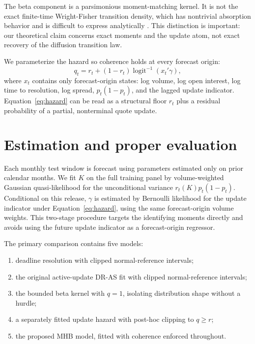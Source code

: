 \documentclass[11pt]{article}
\newcommand{\1}{\mathbb I}
\begin{document}
The beta component is a parsimonious moment-matching kernel. It is not the exact
finite-time Wright-Fisher transition density, which has nontrivial absorption
behavior and is difficult to express analytically \citep{roa2022smalltime}.
This distinction is important: our theoretical claim concerns exact moments and
the update atom, not exact recovery of the diffusion transition law.

We parameterize the hazard so coherence holds at every forecast origin:
\begin{equation}
q_t=r_t+(1-r_t)\operatorname{logit}^{-1}(x_t'\gamma),
\label{eq:hazard}
\end{equation}
where $x_t$ contains only forecast-origin states: log volume, log open interest,
log time to resolution, log spread, $p_t(1-p_t)$, and the lagged update
indicator. Equation~\eqref{eq:hazard} can be read as a structural floor $r_t$
plus a residual probability of a partial, nonterminal quote update.

\section{Estimation and proper evaluation}

Each monthly test window is forecast using parameters estimated only on prior
calendar months. We fit $K$ on the full training panel by volume-weighted Gaussian
quasi-likelihood for the unconditional variance $r_t(K)p_t(1-p_t)$. Conditional
on this release, $\gamma$ is estimated by Bernoulli likelihood for the update
indicator under Equation~\eqref{eq:hazard}, using the same forecast-origin volume
weights. This two-stage procedure targets
the identifying moments directly and avoids using the future update indicator
as a forecast-origin regressor.

The primary comparison contains five models:
\begin{enumerate}[leftmargin=*]
\item deadline resolution with clipped normal-reference intervals;
\item the original active-update DR-AS fit with clipped normal-reference
intervals;
\item the bounded beta kernel with $q=1$, isolating distribution shape without
a hurdle;
\item a separately fitted update hazard with post-hoc clipping to $q\ge r$;
\item the proposed MHB model, fitted with coherence enforced throughout.
\end{enumerate}
\end{document}
